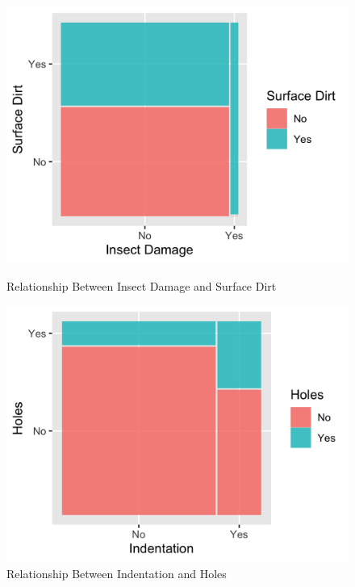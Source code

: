 \documentclass[11pt, oneside]{article}
\begin{document}
\begin{figure}[H]
    \centering
    \captionsetup{justification=centering}
    \begin{minipage}{0.5\textwidth}
        \centering
        \includegraphics[width=1\textwidth]{images/insect_dirt_mosaic.png} 
        \caption{Relationship Between Insect Damage and Surface Dirt}
        \label{insect_dirt}
    \end{minipage}\hfill
    \begin{minipage}{0.5\textwidth}
        \centering
        \includegraphics[width=1\textwidth]{images/indent_holes_mosaic.png} 
        \caption{Relationship Between Indentation and Holes}
        \label{indent_holes}
    \end{minipage}
\end{figure}
\end{document}
